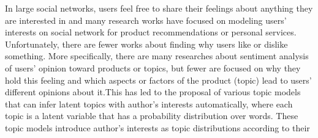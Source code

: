 \documentclass[runningheads,a4paper]{llncs}
\begin{document}
In large social networks, users feel free to share their feelings about anything they are interested in and many research works have focused on modeling users’ interests on social network for product
recommendations or personal services. Unfortunately,
there are fewer works about finding why users like or dislike something. More specifically,
there are many researches about
sentiment analysis of users’ opinion toward products or topics, but fewer are focused on why they hold this feeling and which aspects or factors of the product (topic) lead to users’ different opinions about it.This has led to the proposal of various topic models that can infer latent topics with author’s interests automatically, where each topic is a latent variable that has a probability distribution over words. These topic models introduce author’s
interests as topic distributions according to their
\end{document}
